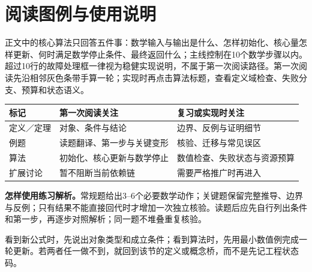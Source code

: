 \chapter*{阅读图例与使用说明}
\hypertarget{SL:reading-legend}{}

\begin{keypointbox}[title=先理解数学对象，再检查稳健实现]
正文中的核心算法只回答五件事：数学输入与输出是什么、怎样初始化、核心量怎样更新、何时满足数学停止条件、最终返回什么；主线控制在10个数学步骤以内。超过10行的故障处理框一律视为稳健实现说明，不属于第一次阅读路径。第一次阅读先沿相邻灰色条带手算一轮；实现时再点击算法标题，查看定义域检查、失败分支、预算和状态语义。
\end{keypointbox}

\begin{comparisonbox}
\begin{tabularx}{\linewidth}{@{}lXX@{}}
\toprule
标记 & 第一次阅读关注 & 复习或实现时关注\\ \midrule
定义／定理 & 对象、条件与结论 & 边界、反例与证明细节\\
例题 & 读题翻译、第一步与关键变形 & 核验、迁移与常见误区\\
算法 & 初始化、核心更新与数学停止 & 数值检查、失败状态与资源预算\\
扩展讨论 & 暂不阻断当前依赖链 & 需要严格推广时再进入\\
\bottomrule
\end{tabularx}
\end{comparisonbox}

\noindent\textbf{怎样使用练习解析。}常规题给出3--6个必要数学动作；关键题保留完整推导、边界与反例；只有结果不能直接回代时才增加一次独立核验。读题后应先自行列出条件和第一步，再逐步对照解析；同一题不堆叠重复核验。

\begin{selfcheckbox}[title=30秒阅读自检]
看到新公式时，先说出对象类型和成立条件；看到算法时，先用最小数值例完成一轮更新。若两者任一做不到，就回到该节的定义或概念桥，而不是先记工程状态码。
\end{selfcheckbox}
